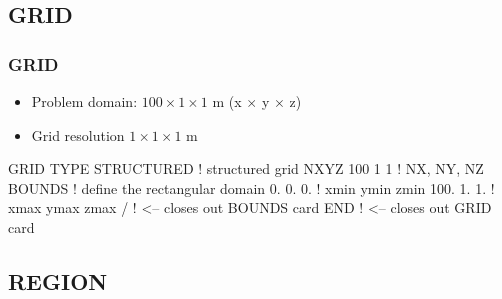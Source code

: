 \documentclass{beamer}
\newcommand\bluecomment[1]{{{\color{blue} #1}}}
\begin{document}
\subsection{GRID}
\begin{frame}\frametitle{GRID}

\begin{itemize}
  \item Problem domain: $100 \times 1 \times 1$ m (x $\times$ y $\times$ z)
  \item Grid resolution $1 \times 1 \times 1$ m
\end{itemize}

\begin{semiverbatim}
GRID
  TYPE STRUCTURED     \bluecomment{! structured grid}
  NXYZ 100 1 1        \bluecomment{! NX, NY, NZ}
  BOUNDS              \bluecomment{! define the rectangular domain}
    0. 0. 0.          \bluecomment{! xmin ymin zmin}
    100. 1. 1.        \bluecomment{! xmax ymax zmax}
  /  \bluecomment{! <-- closes out BOUNDS card}
END  \bluecomment{! <-- closes out GRID card}
\end{semiverbatim}

\end{frame}

\subsection{REGION}
\end{document}
